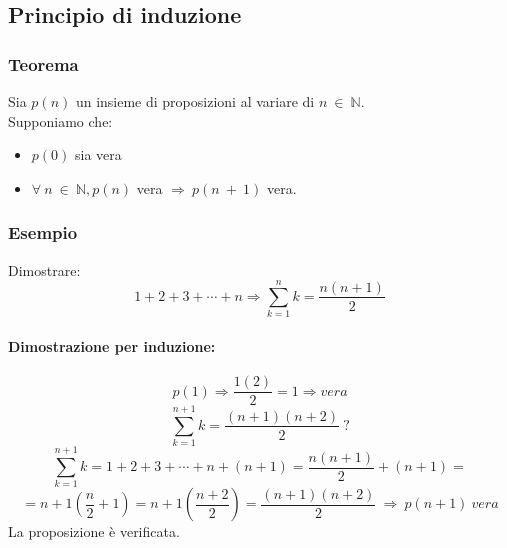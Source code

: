\subsection{Principio di induzione}
        \subsubsection*{Teorema}
            Sia $p(n)$ un insieme di proposizioni al variare di $n\ \in\ \mathbb{N}$.\\
            Supponiamo che:\\
            \begin{itemize}
                \item $p(0)$ sia vera
                \item $\forall\ n\ \in\ \mathbb{N}, p(n)$ vera $\Rightarrow\ p(n\ +\ 1)$ vera. 
            \end{itemize}
        \subsubsection*{Esempio}
        Dimostrare: \[1+2+3+\cdots+n \Rightarrow \sum_{k=1}^{n}k = \frac{n(n+1)}{2}\] 
            \paragraph{Dimostrazione per induzione: \\}
            \begin{equation}
                p(1) \Rightarrow \frac{1(2)}{2} = 1 \Rightarrow vera
            \end{equation}
            \begin{equation}
                    \sum_{k=1}^{n+1}k = \frac{(n+1)(n+2)}{2}\ ?
            \end{equation}
            \begin{equation*}
                \sum_{k=1}^{n+1}k = 1+2+3+\cdots+n+(n+1) = \frac{n(n+1)}{2}+(n+1)=
            \end{equation*}
            \begin{equation*}
                =n+1(\frac{n}{2}+1)=n+1(\frac{n+2}{2})=\frac{(n+1)(n+2)}{2}\ \Rightarrow\ p(n+1)\ vera
            \end{equation*}
            \hfill \break
            La proposizione è verificata.
\